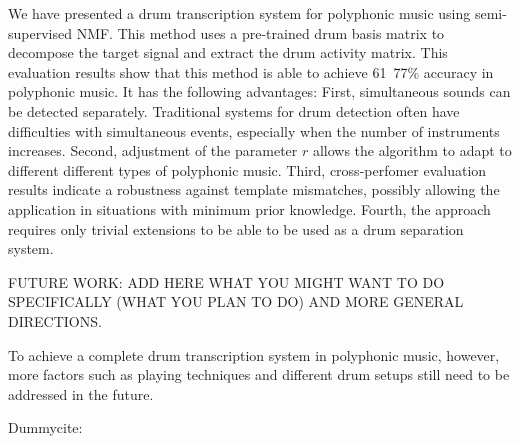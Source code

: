 \documentclass{article}
\begin{document}
We have presented a drum transcription system for polyphonic music using semi-supervised NMF. This method uses a pre-trained drum basis matrix to decompose the target signal and extract the drum activity matrix. This evaluation results show that this method is able to achieve 61~77\% accuracy in polyphonic music. 
It has the following advantages: 
First, simultaneous sounds can be detected separately. Traditional systems for drum detection often have difficulties with simultaneous events, especially when the number of instruments increases. %
Second, adjustment of the parameter $r$ allows the algorithm to adapt to different different types of polyphonic music. 
Third, cross-perfomer evaluation results indicate a robustness against template mismatches, possibly allowing the application in situations with minimum prior knowledge. %
Fourth, the approach requires only trivial extensions to be able to be used as a drum separation system.

FUTURE WORK: ADD HERE WHAT YOU MIGHT WANT TO DO SPECIFICALLY (WHAT YOU PLAN TO DO) AND MORE GENERAL DIRECTIONS.

To achieve a complete drum transcription system in polyphonic music, however, more factors such as playing techniques and different drum setups still need to be addressed in the future. 

Dummycite: \cite{tzanetakis_musical_2002}

%
%
%
%
%
%
%
\end{document}

